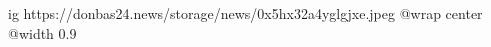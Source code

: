  
 
 
 
 

\ifcmt
  ig https://donbas24.news/storage/news/0x5hx32a4yglgjxe.jpeg
  @wrap center
  @width 0.9
\fi

